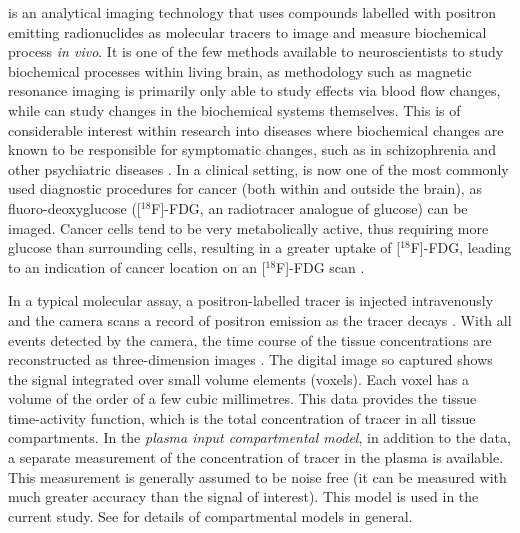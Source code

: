 \pet is an analytical imaging technology that uses compounds labelled with
positron emitting radionuclides as molecular tracers to image and measure
biochemical process \emph{in vivo}. It is one of the few methods available
to neuroscientists to study biochemical processes within living brain, as
methodology such as magnetic resonance imaging is primarily only able to
study effects via blood flow changes, while \pet can study changes in the
biochemical systems themselves. This is of considerable interest within
research into diseases where biochemical changes are known to be
responsible for symptomatic changes, such as in schizophrenia and other
psychiatric diseases \cite{FrankleL2002}.  In a clinical setting, \pet is
now one of the most commonly used diagnostic procedures for cancer (both
within and outside the brain), as fluoro-deoxyglucose ([$^{18}$F]-FDG, an
radiotracer analogue of glucose) can be imaged. Cancer cells tend to be
very metabolically active, thus requiring more glucose than surrounding
cells, resulting in a greater uptake of [$^{18}$F]-FDG, leading to an
indication of cancer location on an [$^{18}$F]-FDG scan \cite{Gambhir2002}.

In a typical molecular assay, a positron-labelled tracer is injected
intravenously and the \pet camera scans a record of positron emission as
the tracer decays \cite{Phelps2000}.  With all events detected by the \pet
camera, the time course of the tissue concentrations are reconstructed as
three-dimension images \cite{Kinahan1989}. The digital image so captured
shows the signal integrated over small volume elements (voxels). Each voxel
has a volume of the order of a few cubic millimetres. This data provides
the tissue time-activity function, which is the total concentration of
tracer in all tissue compartments. In the \emph{plasma input compartmental
  model}, in addition to the \pet data, a separate measurement of the
concentration of tracer in the plasma is available. This measurement is
generally assumed to be noise free (it can be measured with much greater
accuracy than the signal of interest). This model is used in the current
study. See \cite{Gunn:2001cx} for details of \pet compartmental models in
general.

